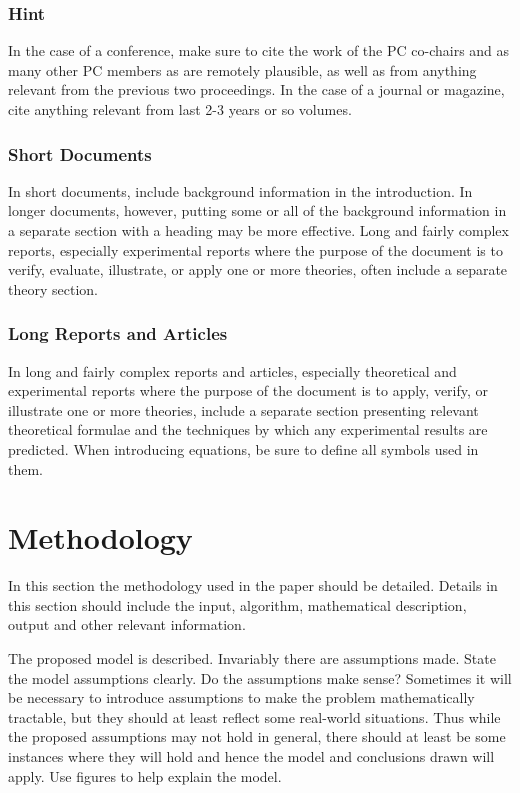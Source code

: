 \documentclass[conference,letterpaper]{IEEEtran}
\begin{document}
\subsubsection{Hint}
In the case of a conference, make sure to cite the work of the PC co-chairs and as many other PC members as are remotely plausible, as well as from anything relevant from the previous two proceedings. In the case of a journal or magazine, cite anything relevant from last 2-3 years or so volumes.

\subsubsection{Short Documents}
In short documents, include background information in the introduction. In longer documents, however, putting some or all of the background information in a separate section with a heading may be more effective. Long and fairly complex reports, especially experimental reports where the purpose of the document is to verify, evaluate, illustrate, or apply one or more theories, often include a separate theory section.

\subsubsection{Long Reports and Articles}
In long and fairly complex reports and articles, especially theoretical and experimental reports where the purpose of the document is to apply, verify, or illustrate one or more theories, include a separate section presenting relevant theoretical formulae and the techniques by which any experimental results are predicted. When introducing equations, be sure to define all symbols used in them.



\section{Methodology}

In this section the methodology used in the paper should be detailed. Details in this section should include the input, algorithm, mathematical description, output and other relevant information.

The proposed model is described. Invariably there are assumptions made. State the model assumptions clearly. Do the assumptions make sense? Sometimes it will be necessary to introduce assumptions to make the problem mathematically tractable, but they should at least reflect some real-world situations. Thus while the proposed assumptions may not hold in general, there should at least be some instances where they will hold and hence the model and conclusions drawn will apply. Use figures to help explain the model.
\end{document}
